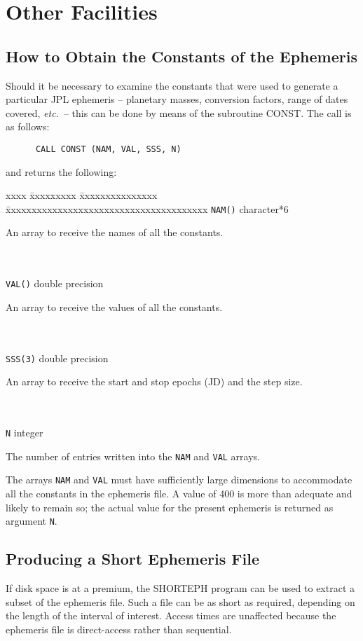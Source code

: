 \section{Other Facilities}

\subsection{How to Obtain the Constants of the Ephemeris}
Should it be necessary to examine the constants that were used to generate a
particular JPL ephemeris --
planetary masses, conversion factors, range of dates
covered, {\it etc.}\ -- this can be done by means of the subroutine CONST.
The call is as follows:
\begin{verbatim}
      CALL CONST (NAM, VAL, SSS, N)
\end{verbatim}
and returns the following:

\begin{tabbing}
xxxx \= xxxxxxxxx \= xxxxxxxxxxxxxxx \=
xxxxxxxxxxxxxxxxxxxxxxxxxxxxxxxxxxxxxxx \kill
\> \verb|NAM()| \> character*6 \>
             \parbox[t]{24em}{An array to receive the names of all
                              the constants.} \\ \\
\> \verb|VAL()| \> double precision \>
              \parbox[t]{24em}{An array to receive the
                               values of all the constants.} \\ \\
\> \verb|SSS(3)| \> double precision \>
              \parbox[t]{24em}{An array to receive the
                               start and stop epochs (JD) and
                               the step size.} \\ \\
\> \verb|N| \> integer \>
              \parbox[t]{24em}{The number of entries written into
                               the \verb|NAM|
                               and \verb|VAL| arrays.}
\end{tabbing}

The arrays \verb|NAM| and \verb|VAL|
must have sufficiently large dimensions to accommodate
all the constants in the ephemeris file.  A value of 400 is
more than adequate and likely to remain so;  the actual value
for the present ephemeris is returned as argument \verb|N|.

\subsection{Producing a Short Ephemeris File}
If disk space is at a premium, the SHORTEPH program
can be used to extract a subset of the ephemeris file.  Such
a file can be as short as required, depending on the
length of the interval of interest.  Access times are unaffected
because the ephemeris file is direct-access rather than sequential.

